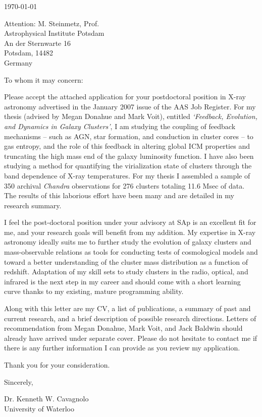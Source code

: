 \documentclass[11pt]{article}
\begin{document}
\today

Attention: M. Steinmetz, Prof.\\
Astrophysical Institute Potsdam\\
An der Sternwarte 16\\
Potsdam, 14482\\
Germany

To whom it may concern:

Please accept the attached application for your postdoctoral
position in X-ray astronomy advertised in the January 2007 issue
of the AAS Job Register. For my thesis (advised by Megan Donahue and
Mark Voit), entitled {\textit{`Feedback, Evolution, and Dynamics in
Galaxy Clusters'}}, I am studying the coupling of feedback mechanisms
-- such as AGN, star formation, and conduction in cluster cores -- to
gas entropy, and the role of this feedback in altering global ICM
properties and truncating the high mass end of the galaxy luminosity
function. I have also been studying a method for quantifying the
virialization state of clusters through the band dependence of X-ray
temperatures. For my thesis I assembled a sample of 350 archival
{\textit{Chandra}} observations for 276 clusters totaling 11.6 Msec of
data. The results of this laborious effort have been many and are
detailed in my research summary.

I feel the post-doctoral position under your advisory at
SAp is an excellent fit for me, and your research goals will benefit
from my addition. My expertise in X-ray astronomy ideally suits me to
further study the evolution of galaxy clusters and mass-observable
relations as tools for conducting tests of cosmological models and
toward a better understanding of the cluster mass distribution as a
function of redshift. Adaptation of my skill sets to study clusters in
the radio, optical, and infrared is the next step in my career and
should come with a short learning curve thanks to my existing, mature
programming ability.

Along with this letter are my CV, a list of publications, a summary of
past and current research, and a brief description of possible research
directions. Letters of recommendation from Megan Donahue, Mark Voit,
and Jack Baldwin should already have arrived under separate
cover. Please do not hesitate to contact me if there is any further
information I can provide as you review my application.

Thank you for your consideration.

Sincerely,\\
\begin{minipage}{7.5in}
\end{minipage}
Dr. Kenneth W. Cavagnolo\\
University of Waterloo
\end{document}
